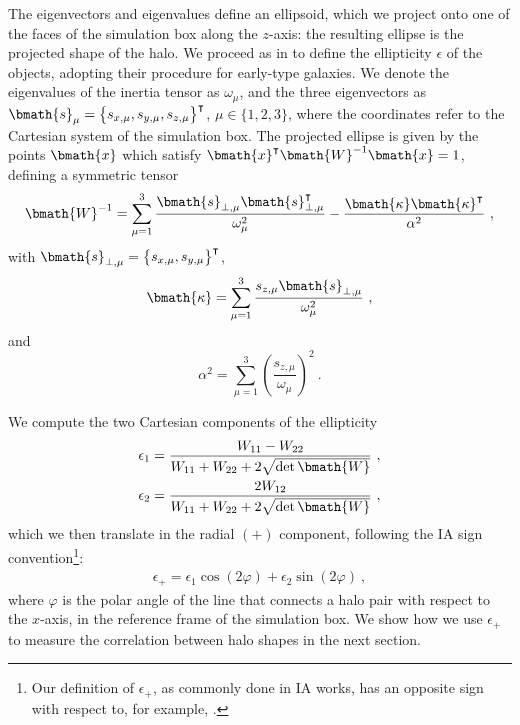 \documentclass[a4paper,fleqn,usenatbib]{mnras}
\begin{document}
The eigenvectors and eigenvalues define an ellipsoid, which we project onto one of the faces of the simulation box along the $z$-axis: the resulting ellipse is the projected shape of the halo. We proceed as in \citet{Joachimietal2013a} to define the ellipticity $\epsilon$ of the 
objects, adopting their procedure for early-type galaxies. We denote the eigenvalues of the inertia tensor as $\omega_{\mu}$, and the three eigenvectors as $\bmath{s}_{\mu} = \big \{ s_{x, \mu}, s_{y, \mu}, s_{z, \mu}\big \}^\intercal$, $\mu \in \{1,2,3\}$, where the coordinates refer to the Cartesian system of the simulation box. The projected ellipse is given by the points $\bmath{x}$ which satisfy $\bmath{x}^{\intercal} \bmath{W}^{-1} \bmath{x} =1$, defining a symmetric tensor
\begin{equation}
    \bmath{W}^{-1} = \sum _{\mu=1}^{3} \frac{\bmath{s}_{\perp, \mu} \bmath{s}^\intercal_{\perp, \mu}}{\omega_{\mu}^2} - \frac{\bmath{\kappa} \bmath{\kappa}^{\intercal}}{\alpha^2} \ ,
	\label{eq:symtensor}
\end{equation}
with $\bmath{s}_{\perp, \mu} = \big \{ s_{x, \mu}, s_{y, \mu}\big \}^\intercal$, 
\begin{equation}
   \bmath{\kappa} = \sum_{\mu = 1}^{3} \frac{s_{z, \mu} \bmath{s}_{\perp, \mu}}{\omega_{\mu}^2} \ ,
	\label{eq:kappa}
\end{equation}
and 
\begin{equation}
    \alpha^2=\sum_{\mu = 1}^{3} \left( \frac{s_{z, \mu}}{\omega_{\mu}} \right)^2 \ .
	\label{eq:alpha}
\end{equation}

We compute the two Cartesian components of the ellipticity \citep{BartelmannSchneider2001}
\begin{align}
    	\epsilon_{1} = \frac{W_{11} - W_{22}}{W_{11} + W_{22}+2\sqrt{\det \bmath{W}}}\ , \\ 
           \epsilon_{2} = \frac{2 W_{12}}{W_{11} + W_{22}+2\sqrt{\det \bmath{W}}} \ ,
\end{align}
which we then translate in the radial $(+)$ 
component, following the IA sign convention\footnote{Our definition of $\epsilon_{+}$, as commonly done in IA works, has an opposite sign with respect to, for example, \citet{BartelmannSchneider2001}.}:
\begin{align}
	\epsilon_{+} = \epsilon_{1} \cos(2\varphi) + \epsilon_{2} \sin(2\varphi)\ ,%
\end{align}
where $\varphi$ is the polar angle of the line that connects a halo pair with respect to the $x$-axis, in the reference frame of the simulation box. We show how we use $\epsilon_{+}$ to measure the correlation between halo shapes in the next section.
\end{document}
